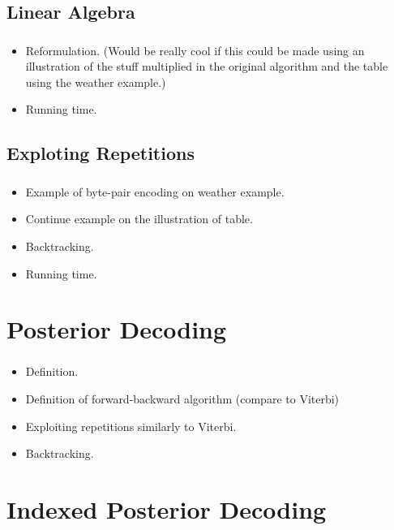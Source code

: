 \documentclass[english]{beamer}
\begin{document}
\subsection{Linear Algebra}

\begin{frame}
  \frametitle{\insertsubsection}
  \begin{itemize}
    \tiny
  \item Reformulation. (Would be really cool if this could be made using an
    illustration of the stuff multiplied in the original algorithm and the
    table using the weather example.)
  \item Running time.
  \end{itemize}
\end{frame}

\subsection{Exploting Repetitions}

\begin{frame}
  \frametitle{\insertsubsection}
  \begin{itemize}
    \tiny
  \item Example of byte-pair encoding on weather example.
  \item Continue example on the illustration of table.
  \item Backtracking.
  \item Running time.
  \end{itemize}
\end{frame}

\section{Posterior Decoding}

\begin{frame}
  \frametitle{\insertsection}
  \begin{itemize}
    \tiny
  \item Definition.
  \item Definition of forward-backward algorithm (compare to Viterbi)
  \item Exploiting repetitions similarly to Viterbi.
  \item Backtracking.
  \end{itemize}
\end{frame}

\section{Indexed Posterior Decoding}
\end{document}
